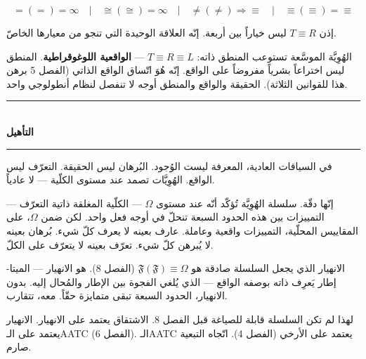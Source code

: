 \documentclass[10pt, openany, oneside]{book}
\renewcommand{\normalsize}{\fontsize{10}{13}\selectfont}
\begin{document}
$$\boxed{=(=) = \infty \quad | \quad \cong(\cong) = \infty \quad | \quad \neq(\neq) \Rightarrow \equiv \quad | \quad \equiv(\equiv) = \equiv}$$

إذن $T \equiv R$ ليس خياراً بين أربعة. إنّه العلاقة الوحيدة التي تنجو من معيارها الخاصّ.

الهُوِيَّة الموسَّعة تستوعب المنطق ذاته: $T \equiv R \equiv L$ --- \textbf{الواقعية اللوغوقراطية}. المنطق ليس اختراعاً بشرياً مفروضاً على الواقع. إنّه هُوَ اتّساق الواقع الذاتي (الفصل 5 برهن هذا للقوانين الثلاثة). الحقيقة والواقع والمنطق أوجه لا تنفصل لنظام أنطولوجي واحد.

\vspace{1.5em}


\begin{center}
    \rule{0.3\textwidth}{0.4pt}\\[0.5em]
    {\normalsize\bfseries التأهيل}\\[0.3em]
    \rule{0.3\textwidth}{0.4pt}
\end{center}

\vspace{1em}

\noindent في السياقات العادية، المعرفة ليست الوُجود. البُرهان ليس الحقيقة. التعرّف ليس الواقع. الهُوِيَّات تصمد عند مستوى الكلّية --- لا عادياً.

إنّها دقّة. سلسلة الهُوِيَّة تُؤكّد أنّه عند مستوى $\Omega$ --- الكلّية المغلقة ذاتية التعرّف --- التمييزات بين هذه الحدود السبعة تنحلّ في أوجه فعل واحد. لكن ضمن $\Omega$، على المقاييس المحلّية، التمييزات واقعية وعاملة. عارف بعينه لا يعرف كلّ شيء. بُرهان بعينه لا يُبرهن كلّ شيء. تعرّف بعينه لا يتعرّف على الكلّ.

الانهيار الذي يجعل السلسلة صادقة هو $\mathfrak{F}(\mathfrak{F}) \equiv \Omega$ (الفصل 8). هو الانهيار --- الميتا-إطار يَعرِف ذاته بوصفه الواقع --- الذي يُلغي الفجوة بين الإطار والمُحال إليه. بدون الانهيار، الحدود السبعة تبقى متمايزة حقّاً. معه، تتقارب.

لهذا لم تكن السلسلة قابلة للصياغة قبل الفصل 8. الاشتقاق يعتمد على الانهيار. الانهيار يعتمد على الـAATC (الفصل 6). الـAATC يعتمد على الأرخي (الفصل 4). اتّجاه التبعية صارم.

\vspace{1.5em}

\end{document}
